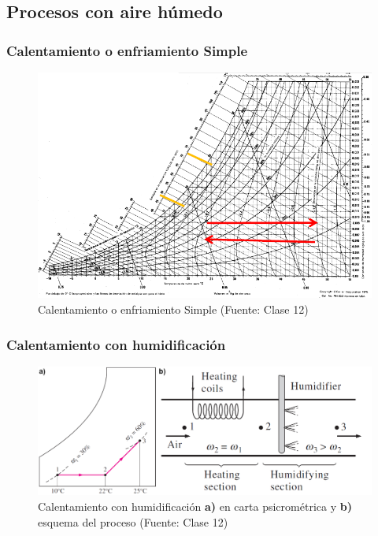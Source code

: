     \subsection{Procesos con aire húmedo}
        
        \subsubsection{Calentamiento o enfriamiento Simple}
        
        \begin{figure}
            \includegraphics[width=.9\textwidth]{img/clases/cal_enfr_simple.png}
            \caption{Calentamiento o enfriamiento Simple (Fuente: Clase 12)}
            \label{fig:cal_enfr_simple}
        \end{figure}
        
        \subsubsection{Calentamiento con humidificación}
        
        \begin{figure}
            \includegraphics[width=\textwidth]{img/clases/cal_humidificacion.png}
            \caption[Calentamiento con humidificación]{Calentamiento con humidificación \textbf{a)} en carta psicrométrica y \textbf{b)} esquema del proceso (Fuente: Clase 12)}
            \label{fig:cal_humidificacion}
        \end{figure}
        
